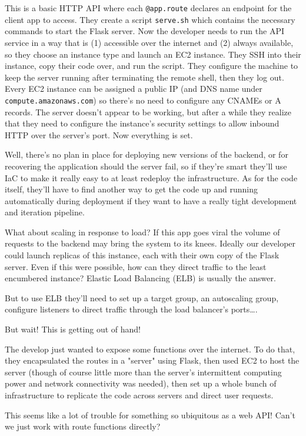 \documentclass{article}
\newcommand{\icode}[1]{\texttt{#1}}
\begin{document}
This is a basic HTTP API where each \icode{@app.route} declares an endpoint for the client app to access.
They create a script \texttt{serve.sh} which contains the necessary commands to start the Flask server.
Now the developer needs to run the API service in a way that is (1) accessible over the internet and (2) always available, so they choose an instance type and launch an EC2 instance.
They SSH into their instance, copy their code over, and run the script.
They configure the machine to keep the server running after terminating the remote shell, then they log out.
Every EC2 instance can be assigned a public IP (and DNS name under \texttt{compute.amazonaws.com}) so there's no need to configure any CNAMEs or A records.
The server doesn't appear to be working, but after a while they realize that they need to configure the instance's security settings to allow inbound HTTP over the server's port.
Now everything is set.

Well, there's no plan in place for deploying new versions of the backend, or for recovering the application should the server fail, so if they're smart they'll use IaC to make it really easy to at least redeploy the infrastructure.
As for the code itself, they'll have to find another way to get the code up and running automatically during deployment if they want to have a really tight development and iteration pipeline.

What about scaling in response to load?
If this app goes viral the volume of requests to the backend may bring the system to its knees.
Ideally our developer could launch replicas of this instance, each with their own copy of the Flask server.
Even if this were possible, how can they direct traffic to the least encumbered instance?
Elastic Load Balancing (ELB) is usually the answer.

But to use ELB they'll need to set up a target group, an autoscaling group, configure listeners to direct traffic through the load balancer's ports\ldots.

But wait!
This is getting out of hand!

The develop just wanted to expose some functions over the internet.
To do that, they encapsulated the routes in a "server" using Flask, then used EC2 to host the server (though of course little more than the server's intermittent computing power and network connectivity was needed), then set up a whole bunch of infrastructure to replicate the code across servers and direct user requests.

This seems like a lot of trouble for something so ubiquitous as a web API!
Can't we just work with route functions directly?
\end{document}
